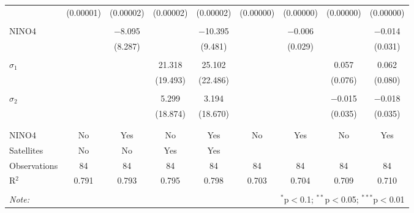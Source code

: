 \begin{table}[!htbp]
\begin{tabular}{@{\extracolsep{1pt}}lcccccccc}
  & (0.00001) & (0.00002) & (0.00002) & (0.00002) & (0.00000) & (0.00000) & (0.00000) & (0.00000) \\ 
  & & & & & & & & \\ 
 NINO4 &  & $-$8.095 &  & $-$10.395 &  & $-$0.006 &  & $-$0.014 \\ 
  &  & (8.287) &  & (9.481) &  & (0.029) &  & (0.031) \\ 
  & & & & & & & & \\ 
 $\sigma_1$ &  &  & 21.318 & 25.102 &  &  & 0.057 & 0.062 \\ 
  &  &  & (19.493) & (22.486) &  &  & (0.076) & (0.080) \\ 
  & & & & & & & & \\ 
 $\sigma_2$ &  &  & 5.299 & 3.194 &  &  & $-$0.015 & $-$0.018 \\ 
  &  &  & (18.874) & (18.670) &  &  & (0.035) & (0.035) \\ 
  & & & & & & & & \\ 
\hline \\[-1.8ex] 
NINO4 & No & Yes & No & Yes & No & Yes & No & Yes \\ 
Satellites & No & No & Yes & Yes &  &  &  &  \\ 
Observations & 84 & 84 & 84 & 84 & 84 & 84 & 84 & 84 \\ 
R$^{2}$ & 0.791 & 0.793 & 0.795 & 0.798 & 0.703 & 0.704 & 0.709 & 0.710 \\ 
\hline 
\hline \\[-1.8ex] 
\textit{Note:}  & \multicolumn{8}{r}{$^{*}$p$<$0.1; $^{**}$p$<$0.05; $^{***}$p$<$0.01} \\ 
\end{tabular} 
\end{table} 
